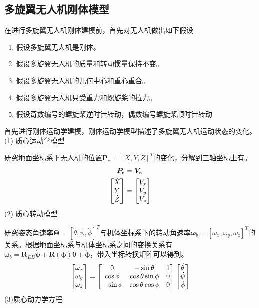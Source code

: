 \subsection{多旋翼无人机刚体模型}
在进行多旋翼无人机刚体建模前，首先对无人机做出如下假设
\begin{enumerate}[label={(\arabic*)}]
\item 假设多旋翼无人机是刚体。
\item 假设多旋翼无人机的质量和转动惯量保持不变。
\item 假设多旋翼无人机的几何中心和重心重合。
\item 假设多旋翼无人机只受重力和螺旋桨的拉力。
\item 假设奇数编号的螺旋桨逆时针转动，偶数编号螺旋桨顺时针转动
\end{enumerate}

首先进行刚体运动学建模，刚体运动学模型描述了多旋翼无人机运动状态的变化。\\
(1) 质心运动学模型

研究地面坐标系下无人机的位置$\boldsymbol{P}_e = [X,Y,Z]^T$的变化，分解到三轴坐标上有。
\begin{equation}
\label{equ2.2}
\begin{aligned}
\boldsymbol{P}_e &= \boldsymbol{V}_e \\
\begin{bmatrix}
\dot{X} \cr \dot{Y} \cr \dot{Z} \cr
\end{bmatrix}
&=
\begin{bmatrix}
V_x \cr V_y \cr V_z \cr
\end{bmatrix}
\end{aligned}
\end{equation}
(2) 质心转动模型

研究姿态角速率$\dot{\boldsymbol{\Theta}}=[\dot{\theta},\dot{\psi},\dot{\phi}]^T$与机体坐标系下的转动角速率$\boldsymbol{\omega}_b=[\omega_x , \omega_y , \omega_z]^T$的关系。根据地面坐标系与机体坐标系之间的变换关系有$\boldsymbol{\omega}_b = \boldsymbol{R}_{EB} \dot{\boldsymbol{\psi}}+\boldsymbol{R}(\boldsymbol{\phi}) \dot{\boldsymbol{\theta}}+ \dot{\boldsymbol{\phi}} $，带入坐标转换矩阵可以得到。
\begin{equation}
\label{equ2.3}
\begin{aligned}
\begin{bmatrix}
\omega_x \cr \omega_y \cr \omega_z \cr
\end{bmatrix}
=
\begin{bmatrix}
0 & -\sin \theta & 1 \cr
\cos \phi & \cos \theta \sin \phi & 0 \cr
-\sin \phi & \cos \theta \cos \phi & 0 \cr
\end{bmatrix}
\begin{bmatrix}
\dot{\theta} \cr \dot{\psi}  \cr  \dot{\phi} \cr
\end{bmatrix}
\end{aligned}
\end{equation}
(3)质心动力学方程


